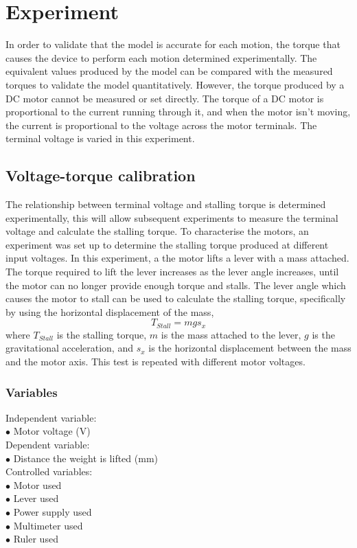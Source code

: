 \chapter{Experiment}

In order to validate that the model is accurate for each motion, the torque that causes the device to perform each motion determined experimentally. The equivalent values produced by the model can be compared with the measured torques to validate the model quantitatively. However, the torque produced by a DC motor cannot be measured or set directly. The torque of a DC motor is proportional to the current running through it, and when the motor isn't moving, the current is proportional to the voltage across the motor terminals. The terminal voltage is varied in this experiment.

\section{Voltage-torque calibration}
The relationship between terminal voltage and stalling torque is determined experimentally, this will allow subsequent experiments to measure the terminal voltage and calculate the stalling torque.
To characterise the motors, an experiment was set up to determine the stalling torque produced at different input voltages. In this experiment, a the motor lifts a lever with a mass attached. The torque required to lift the lever increases as the lever angle increases, until the motor can no longer provide enough torque and stalls. The lever angle which causes the motor to stall can be used to calculate the stalling torque, specifically by using the horizontal displacement of the mass,
\begin{equation}
	T_{Stall} = m g s_x
\end{equation}
where $T_{Stall}$ is the stalling torque, $m$ is the mass attached to the lever, $g$ is the gravitational acceleration, and $s_x$ is the horizontal displacement between the mass and the motor axis.
This test is repeated with different motor voltages.\\

\subsection{Variables}
Independent variable:\\
$\bullet$ Motor voltage (V)\\
Dependent variable:\\
$\bullet$ Distance the weight is lifted (mm)\\
Controlled variables:\\
$\bullet$ Motor used\\
$\bullet$ Lever used\\
$\bullet$ Power supply used\\
$\bullet$ Multimeter used\\
$\bullet$ Ruler used\\

